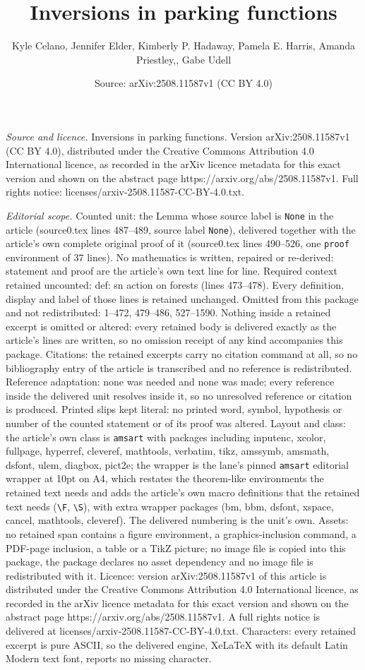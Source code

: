 \documentclass[10pt,a4paper]{amsart}
\title[Inversions in parking functions]{Inversions in parking functions}
\author{Kyle Celano, Jennifer Elder, Kimberly P. Hadaway, Pamela E. Harris, Amanda Priestley,, Gabe Udell}
\date{Source: arXiv:2508.11587v1 (CC BY 4.0)}
\begin{document}
\maketitle

\noindent\emph{Source and licence.} Inversions in parking functions. Version arXiv:2508.11587v1 (CC BY 4.0), distributed under the Creative Commons Attribution 4.0 International licence, as recorded in the arXiv licence metadata for this exact version and shown on the abstract page https://arxiv.org/abs/2508.11587v1. Full rights notice: licenses/arxiv-2508.11587-CC-BY-4.0.txt.\par\smallskip

\noindent\textit{Editorial scope.} Counted unit: the Lemma whose source label is \texttt{None} in the article (source0.tex lines 487--489, source label \texttt{None}), delivered together with the article's own complete original proof of it (source0.tex lines 490--526, one \texttt{proof} environment of 37 lines). No mathematics is written, repaired or re-derived: statement and proof are the article's own text line for line. Required context retained uncounted: def: sn action on forests (lines 473--478). Every definition, display and label of those lines is retained unchanged. Omitted from this package and not redistributed: 1--472, 479--486, 527--1590. Nothing inside a retained excerpt is omitted or altered: every retained body is delivered exactly as the article's lines are written, so no omission receipt of any kind accompanies this package. Citations: the retained excerpts carry no citation command at all, so no bibliography entry of the article is transcribed and no reference is redistributed. Reference adaptation: none was needed and none was made; every reference inside the delivered unit resolves inside it, so no unresolved reference or citation is produced. Printed slips kept literal: no printed word, symbol, hypothesis or number of the counted statement or of its proof was altered. Layout and class: the article's own class is \texttt{amsart} with packages including inputenc, xcolor, fullpage, hyperref, cleveref, mathtools, verbatim, tikz, amssymb, amsmath, dsfont, ulem, diagbox, pict2e; the wrapper is the lane's pinned \texttt{amsart} editorial wrapper at 10pt on A4, which restates the theorem-like environments the retained text needs and adds the article's own macro definitions that the retained text needs (\texttt{\textbackslash F}, \texttt{\textbackslash S}), with extra wrapper packages (bm, bbm, dsfont, xspace, cancel, mathtools, cleveref). The delivered numbering is the unit's own. Assets: no retained span contains a figure environment, a graphics-inclusion command, a PDF-page inclusion, a table or a TikZ picture; no image file is copied into this package, the package declares no asset dependency and no image file is redistributed with it. Licence: version arXiv:2508.11587v1 of this article is distributed under the Creative Commons Attribution 4.0 International licence, as recorded in the arXiv licence metadata for this exact version and shown on the abstract page https://arxiv.org/abs/2508.11587v1. A full rights notice is delivered at licenses/arxiv-2508.11587-CC-BY-4.0.txt. Characters: every retained excerpt is pure ASCII, so the delivered engine, XeLaTeX with its default Latin Modern text font, reports no missing character.
\end{document}
